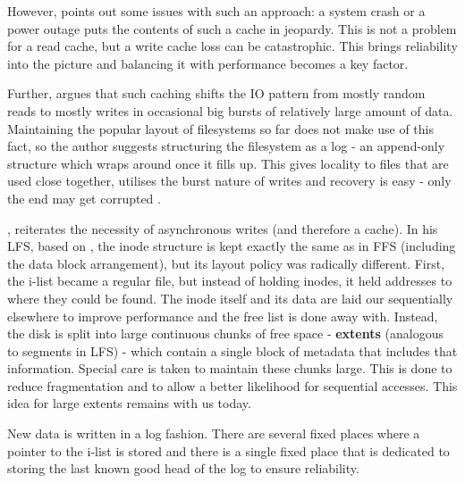             However,  points out some issues with
            such an approach: a system crash or a power outage puts the
            contents of such a cache in jeopardy. This is not a problem for a
            read cache, but a write cache loss can be catastrophic. This brings
            reliability into the picture and balancing it with performance
            becomes a key factor.

            Further,  argues that such caching shifts
            the IO pattern from mostly random reads to mostly writes in
            occasional big bursts of relatively large amount of data.
            Maintaining the popular layout of filesystems so far does not make
            use of this fact, so the author suggests structuring the filesystem
            as a log - an append-only structure which wraps around once it
            fills up. This gives locality to files that are used close
            together, utilises the burst nature of writes and recovery is easy
            - only the end may get corrupted \cite{IO_bottleneck}.

            , reiterates the necessity of asynchronous writes
            (and therefore a cache). In his LFS, based on \cite{IO_bottleneck},
            the inode structure is kept exactly the same as in FFS (including
            the data block arrangement), but its layout policy was radically
            different. First, the i-list became a regular file, but instead of
            holding inodes, it held addresses to where they could be found. The
            inode itself and its data are laid our sequentially elsewhere to
            improve performance and the free list is done away with. Instead,
            the disk is split into large continuous chunks of free space -
            \textbf{extents} (analogous to segments in LFS) - which contain a
            single block of metadata that includes that information.  Special
            care is taken to maintain these chunks large. This is done to
            reduce fragmentation and to allow a better likelihood for
            sequential accesses. This idea for large extents remains with us
            today.

            New data is written in a log fashion. There are several fixed
            places where a pointer to the i-list is stored and there is a
            single fixed place that is dedicated to storing the last known good
            head of the log to ensure reliability.

